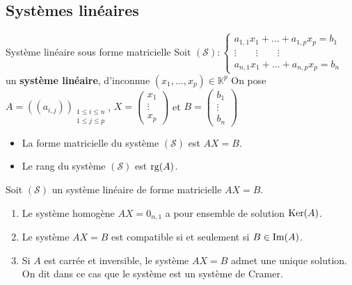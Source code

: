 \subsection{Systèmes linéaires}

    \begin{defi}{Système linéaire sous forme matricielle}{}
        Soit $(\mathcal{S}) : \left\{ \begin{array}{l}
            a_{1,1}x_1 + \ldots + a_{1,p}x_p = b_1 \\
            \vdots \qquad \vdots \qquad \vdots \\
            a_{n,1}x_1 + \ldots + a_{n,p}x_p = b_n
        \end{array} \right.$ un \textbf{système linéaire}, d’inconnue $(x_1,\ldots,x_p) \in \mathbb{K}^p$
        On pose $A = \left((a_{i,j})\right)_{\substack{1 \leq i \leq n \\ 1 \leq j \leq p}}$, $X = \begin{pmatrix}
            x_1 \\
            \vdots \\
            x_p 
        \end{pmatrix}$ et $B = \begin{pmatrix}
            b_1 \\
            \vdots \\
            b_n
        \end{pmatrix}$
        \begin{itemize}
            \item La forme matricielle du système $(\mathcal{S})$ est $AX = B$.
            \item Le rang du système $(\mathcal{S})$ est $\operatorname{rg}(A)$.
        \end{itemize}
    \end{defi}

    \begin{prop}{}{}
        Soit $(\mathcal{S})$ un système linéaire de forme matricielle $AX = B$.
        \begin{enumerate}
            \item Le système homogène $AX = 0_{n,1}$ a pour ensemble de solution $\operatorname{Ker}(A)$.
            \item Le système $AX = B$ est compatible si et seulement si $B \in \operatorname{Im}(A)$.
            \item Si $A$ est carrée et inversible, le système $AX = B$ admet une unique solution. On dit dans ce cas que le système est un système de Cramer.
        \end{enumerate}
    \end{prop}  

